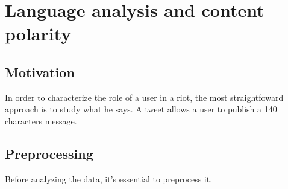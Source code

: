 \documentclass[a4paper,twoside,12pt,openright]{report}
\newcommand{\toprt}[1]{
\pgfplotstableread[col sep=comma, ignore chars={\",\\,\#}]{#1}{\table}

\pgfplotstabletypeset[
	columns/content/.style={column type=C},
	string type,
	every head row/.style={
        before row={\toprule}, %
        after row={
            \midrule} %
            },
    after row={\midrule}, %
    every last row/.style={after row=\bottomrule}, %
    ] {\table}
}
\begin{document}
\newpage



\chapter{Language analysis and content polarity}
\section{Motivation}
In order to characterize the role of a user in a riot, the most straightfoward approach is to study what he says. A tweet allows a user to publish a 140 characters message. 

\newpage
\section{Preprocessing}
Before analyzing the data, it's essential to preprocess it. 

\end{document}
